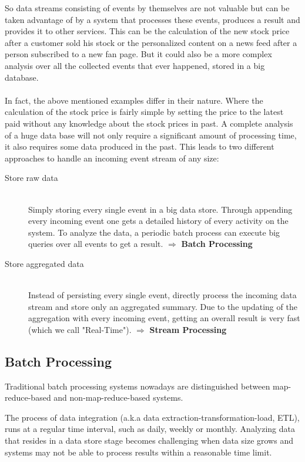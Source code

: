 So data streams consisting of events by themselves are not valuable but
can be taken advantage of by a system that processes these events, produces a
result and provides it to other services. This can be the calculation of the new
stock price after a customer sold his stock or the personalized content on a
news feed after a person subscribed to a new fan page. But it could also be a
more complex analysis over all the collected events that ever happened, stored in
a big database. 
\\ \\
In fact, the above mentioned examples differ in their nature. Where the
calculation of the stock price is fairly simple by setting the price to the
latest paid without any knowledge about the stock prices in past.
A complete analysis of a huge data base will not only require a
significant amount of processing time, it also requires some data produced in the
past. This leads to two different approaches to handle an incoming event stream
of any size: 

\begin{description}
    \item[Store raw data]  \hfill \\
    {Simply storing every single event in a big data store. Through appending
    every incoming event one gets a detailed history of every activity on the system.
    To analyze the data, a periodic batch process can execute big queries over
    all events to get a result.  $ \Rightarrow $  \textbf{Batch Processing}}
    \item[Store aggregated data  ] \hfill \\
    {Instead of persisting every single event, directly process the incoming data stream and store
    only an aggregated summary. Due to the updating of the aggregation with every
    incoming event, getting an overall result is very fast (which we call
    "Real-Time"). $ \Rightarrow $ \textbf{Stream Processing}} 
\end{description}
\cite{TalkKleppmann}


\subsection{Batch Processing}
\label{intro-datastream-batchprocessing}
Traditional batch processing systems nowadays are distinguished between
map-reduce-based and non-map-reduce-based systems.

The process of  data integration (a.k.a data extraction-transformation-load, ETL), 
runs at a regular time interval, such as daily, weekly or
monthly. Analyzing data that resides in a data store stage becomes
challenging when data size grows and systems may not be able to process results
within a reasonable time limit. \cite{Liu:2014:SRP:2628194.2628251}


